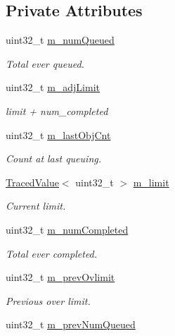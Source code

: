 \subsection*{Private Attributes}
\begin{DoxyCompactItemize}
\item 
uint32\+\_\+t \hyperlink{classns3_1_1DynamicQueueLimits_a5ac74a84c50fccf99c9580d21554146b}{m\+\_\+num\+Queued}
\begin{DoxyCompactList}\small\item\em Total ever queued. \end{DoxyCompactList}\item 
uint32\+\_\+t \hyperlink{classns3_1_1DynamicQueueLimits_a01bb59a1f0048f3b0206d86f1c0ca0ba}{m\+\_\+adj\+Limit}
\begin{DoxyCompactList}\small\item\em limit + num\+\_\+completed \end{DoxyCompactList}\item 
uint32\+\_\+t \hyperlink{classns3_1_1DynamicQueueLimits_a9c73bed5ccb64c8c93ebb8ba3579f6a5}{m\+\_\+last\+Obj\+Cnt}
\begin{DoxyCompactList}\small\item\em Count at last queuing. \end{DoxyCompactList}\item 
\hyperlink{classns3_1_1TracedValue}{Traced\+Value}$<$ uint32\+\_\+t $>$ \hyperlink{classns3_1_1DynamicQueueLimits_ace85f564a3f7b4aadfed9dc7df775579}{m\+\_\+limit}
\begin{DoxyCompactList}\small\item\em Current limit. \end{DoxyCompactList}\item 
uint32\+\_\+t \hyperlink{classns3_1_1DynamicQueueLimits_a324eecdc6e60e01387b707d64caa117c}{m\+\_\+num\+Completed}
\begin{DoxyCompactList}\small\item\em Total ever completed. \end{DoxyCompactList}\item 
uint32\+\_\+t \hyperlink{classns3_1_1DynamicQueueLimits_a63d5c451bd659754d9968445e5c3a1b9}{m\+\_\+prev\+Ovlimit}
\begin{DoxyCompactList}\small\item\em Previous over limit. \end{DoxyCompactList}\item 
uint32\+\_\+t \hyperlink{classns3_1_1DynamicQueueLimits_a88d80e7cd24b67993d9416ff0c7fd75d}{m\+\_\+prev\+Num\+Queued}

\end{DoxyCompactItemize}
